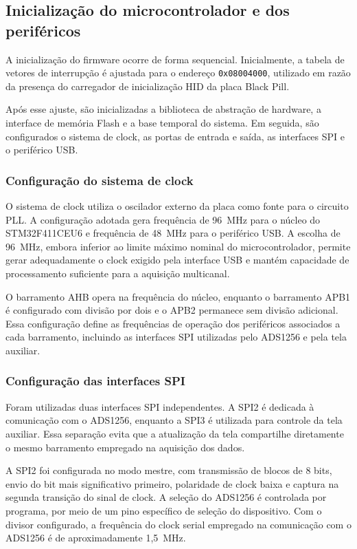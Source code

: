 \documentclass[a4paper,12pt]{fcte}
\begin{document}
\subsection{Inicialização do microcontrolador e dos periféricos}
\label{subsec:inicializacao_firmware}

A inicialização do firmware ocorre de forma sequencial. Inicialmente, a tabela de vetores de interrupção é ajustada para o endereço \texttt{0x08004000}, utilizado em razão da presença do carregador de inicialização HID da placa Black Pill.

Após esse ajuste, são inicializadas a biblioteca de abstração de hardware, a interface de memória Flash e a base temporal do sistema. Em seguida, são configurados o sistema de clock, as portas de entrada e saída, as interfaces SPI e o periférico USB.

\subsubsection{Configuração do sistema de clock}

O sistema de clock utiliza o oscilador externo da placa como fonte para o circuito PLL. A configuração adotada gera frequência de 96~MHz para o núcleo do STM32F411CEU6 e frequência de 48~MHz para o periférico USB. A escolha de 96~MHz, embora inferior ao limite máximo nominal do microcontrolador, permite gerar adequadamente o clock exigido pela interface USB e mantém capacidade de processamento suficiente para a aquisição multicanal.

O barramento AHB opera na frequência do núcleo, enquanto o barramento APB1 é configurado com divisão por dois e o APB2 permanece sem divisão adicional. Essa configuração define as frequências de operação dos periféricos associados a cada barramento, incluindo as interfaces SPI utilizadas pelo ADS1256 e pela tela auxiliar.

\subsubsection{Configuração das interfaces SPI}

Foram utilizadas duas interfaces SPI independentes. A SPI2 é dedicada à comunicação com o ADS1256, enquanto a SPI3 é utilizada para controle da tela auxiliar. Essa separação evita que a atualização da tela compartilhe diretamente o mesmo barramento empregado na aquisição dos dados.

A SPI2 foi configurada no modo mestre, com transmissão de blocos de 8 bits, envio do bit mais significativo primeiro, polaridade de clock baixa e captura na segunda transição do sinal de clock. A seleção do ADS1256 é controlada por programa, por meio de um pino específico de seleção do dispositivo. Com o divisor configurado, a frequência do clock serial empregado na comunicação com o ADS1256 é de aproximadamente 1,5~MHz.
\end{document}
